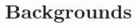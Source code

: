 \documentclass[lnicst]{svmultln}
\begin{document}



\section{Backgrounds}\label{Sect:Backgrounds}
\end{document}
